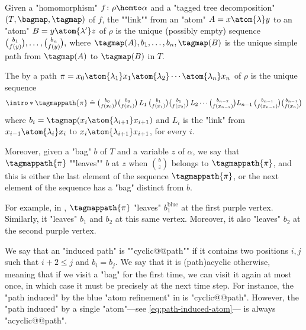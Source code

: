 \begin{definition}
	\AP\label{def:path-induced}
	Given a "homomorphism" $f\colon \rho \homto \alpha$ and a "tagged tree decomposition"
	$(T, \bagmap, \tagmap)$ of $f$,
    the \AP""link"" from an "atom" $A = x \atom{\lambda} y$ to an "atom" $B= y \atom{\lambda'} z$ of $\rho$ is the unique (possibly empty) sequence
    $
            \textstyle{
                {b_{1} \choose f(y)}, \dotsc,
                {b_{n} \choose f(y)},
            }
    $
    where $\tagmap(A), b_{1}, \dotsc, b_n, \tagmap(B)$ is the unique simple path from $\tagmap(A)$ to $\tagmap(B)$ in $T$.

    \AP The  by a path
	$
		\pi = 
		x_0 \atom{\lambda_1} x_1 \atom{\lambda_2} \cdots \atom{\lambda_n} x_n
	$
	of $\rho$ is the unique sequence
    \[
		\intro*\tagmappath{\pi} \defeq
            \textstyle{
                {b_0 \choose \fun(x_0)} {b_0 \choose \fun(x_1)} \,
                L_1 \,
                {b_1 \choose \fun(x_1)} {b_1 \choose \fun(x_2)} \,
                L_2 
                \dotsb 
				{b_{n-2} \choose \fun(x_{n-2})}
                L_{n-1} \,
                {b_{n-1} \choose \fun(x_{n-1})} {b_{n-1} \choose \fun(x_n)}
            }
    \]
    where $b_i = \tagmap(x_i \atom{\lambda_{i+1}} x_{i+1})$ and $L_i$ is the "link" from $x_{i-1} \atom{\lambda_i} x_i$ to $x_{i} \atom{\lambda_{i+1}} x_{i+1}$, for every $i$.
\end{definition}

\AP Moreover, given a "bag" $b$ of $T$ and a variable $z$ of $\alpha$, we say that
$\tagmappath{\pi}$ ""leaves"" $b$ at $z$ when ${b \choose z}$ belongs to
$\tagmappath{\pi}$, and this is either the last element of the sequence $\tagmappath{\pi}$,
or the next element of the sequence has a "bag" distinct from $b$.

For example, in ,
$\tagmappath{\pi}$ "leaves" $b^{\text{blue}}_1$ at the first purple vertex.
Similarly, it "leaves" $b_1$ and $b_2$ at this same vertex. Moreover,
it also "leaves" $b_2$ at the second purple vertex.

We say that an "induced path" is \AP""cyclic@@path"" if it contains two positions $i, j$
such that $i+2 \leq j$ and $b_i = b_{j}$.
We say that it is \reintro(path){acyclic} otherwise,
meaning that if we visit a "bag" for the first time, we can visit it again at
most once, in which case it must be precisely at the next time step.
For instance, the "path induced" by the blue "atom refinement" in 
is "cyclic@@path". However, the "path induced" by a single
"atom"---see \eqref{eq:path-induced-atom}--- is always "acyclic@@path".

